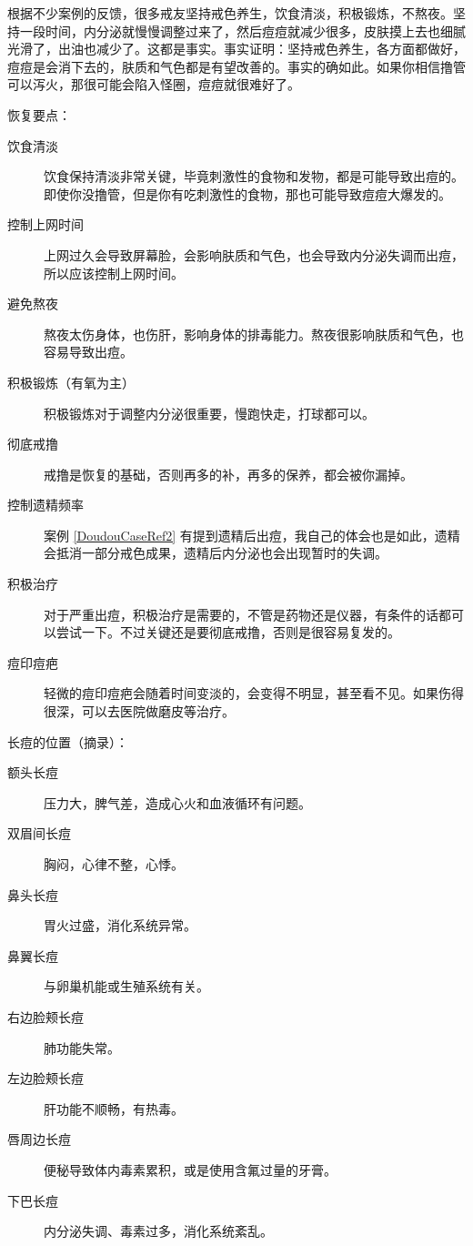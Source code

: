 根据不少案例的反馈，很多戒友坚持戒色养生，饮食清淡，积极锻炼，不熬夜。坚持一段时间，内分泌就慢慢调整过来了，然后痘痘就减少很多，皮肤摸上去也细腻光滑了，出油也减少了。这都是事实。事实证明：坚持戒色养生，各方面都做好，痘痘是会消下去的，肤质和气色都是有望改善的。事实的确如此。如果你相信撸管可以泻火，那很可能会陷入怪圈，痘痘就很难好了。

恢复要点：

\begin{description}
    \item[饮食清淡] 饮食保持清淡非常关键，毕竟刺激性的食物和发物，都是可能导致出痘的。即使你没撸管，但是你有吃刺激性的食物，那也可能导致痘痘大爆发的。
    \item[控制上网时间] 上网过久会导致屏幕脸，会影响肤质和气色，也会导致内分泌失调而出痘，所以应该控制上网时间。
    \item[避免熬夜] 熬夜太伤身体，也伤肝，影响身体的排毒能力。熬夜很影响肤质和气色，也容易导致出痘。
    \item[积极锻炼（有氧为主）] 积极锻炼对于调整内分泌很重要，慢跑快走，打球都可以。
    \item[彻底戒撸] 戒撸是恢复的基础，否则再多的补，再多的保养，都会被你漏掉。
    \item[控制遗精频率] 案例 \ref{DoudouCaseRef2} 有提到遗精后出痘，我自己的体会也是如此，遗精会抵消一部分戒色成果，遗精后内分泌也会出现暂时的失调。
    \item[积极治疗] 对于严重出痘，积极治疗是需要的，不管是药物还是仪器，有条件的话都可以尝试一下。不过关键还是要彻底戒撸，否则是很容易复发的。
    \item[痘印痘疤] 轻微的痘印痘疤会随着时间变淡的，会变得不明显，甚至看不见。如果伤得很深，可以去医院做磨皮等治疗。
\end{description}

长痘的位置（摘录）：

\begin{description}
    \item[额头长痘] 压力大，脾气差，造成心火和血液循环有问题。
    \item[双眉间长痘] 胸闷，心律不整，心悸。
    \item[鼻头长痘] 胃火过盛，消化系统异常。
    \item[鼻翼长痘] 与卵巢机能或生殖系统有关。
    \item[右边脸颊长痘] 肺功能失常。
    \item[左边脸颊长痘] 肝功能不顺畅，有热毒。
    \item[唇周边长痘] 便秘导致体内毒素累积，或是使用含氟过量的牙膏。
    \item[下巴长痘] 内分泌失调、毒素过多，消化系统紊乱。
\end{description}

